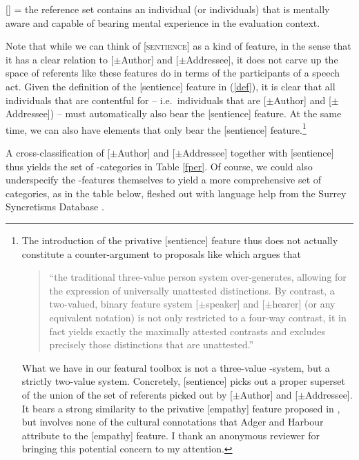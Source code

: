 \documentclass[output=paper, modfonts, nonflat]{langsci/langscibook}
\begin{document}
\ex \textsc{[\sentience]} = the reference set contains an individual (or
individuals) that is mentally aware and capable of bearing mental
experience in the evaluation context.  \z \z


\noindent Note that while we can think of [\textsc{sentience}] as a kind of \person{}
feature, in the sense that it has a clear relation to [$\pm$Author]
and [$\pm$Addressee], it does not carve up the space of referents like
these features do in terms of the participants of a speech
act. Given the definition of the [sentience] feature in (\ref{def}),
it is clear that all individuals that are contentful for \person{} --
i.e.\ individuals that are [$\pm$Author] and [$\pm$Addressee]) --
must automatically also bear the [sentience] feature. At the same
time, we can also have elements that only bear the [sentience]
feature.\footnote{The introduction of the privative [sentience]
  feature thus does not actually constitute a counter-argument to
  proposals like \citet[4]{bobaljik:2008a} which argues that \begin{quotation}``the
  traditional three-value person system over-generates, allowing for
  the expression of universally unattested distinctions. By contrast,
  a two-valued, binary feature system [$\pm$speaker] and [$\pm$hearer]
  (or any equivalent notation) is not only restricted to a four-way
  contrast, it in fact yields exactly the maximally attested contrasts
  and excludes precisely those distinctions that are unattested.''\end{quotation} What we have in our featural toolbox is not a three-value
  \person-system, but a strictly two-value \person{}
  system. Concretely, [sentience] picks out a proper superset of the
  union of the set of referents picked out by [$\pm$Author] and
  [$\pm$Addressee].  It bears a strong similarity to the privative
  [empathy] feature proposed in \citet{adgerharbour:2007}, but
  involves none of the cultural connotations that Adger and Harbour
  attribute to the [empathy] feature. I thank an anonymous reviewer
  for bringing this potential concern to my attention.} %

A cross-classification of [$\pm$Author] and [$\pm$Addressee] together
with [sentience] thus yields the set of \person-categories in Table
\ref{fper}. Of course, we could also underspecify the
  \person-features themselves to yield a more comprehensive set of
  categories, as in the table below, fleshed out with language help
  from the Surrey Syncretisms Database \citep{surrey:2002}.
\end{document}
